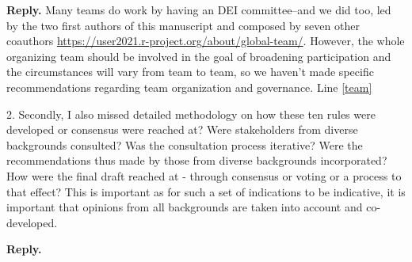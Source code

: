 \documentclass{article}
\newenvironment{Reply}{\noindent\color{BlueViolet}\textbf{Reply.}}{\vspace{1em}}
\begin{document}
\begin{Reply}
Many teams do work by having an DEI committee--and we did too, led by the two first authors of this manuscript and composed by seven other coauthors \url{https://user2021.r-project.org/about/global-team/}. However, the whole organizing team should be involved in the goal of broadening participation and the circumstances will vary from team to team, so we haven't made specific recommendations regarding team organization and governance.
Line \ref{team}



\end{Reply}

2. Secondly, I also missed detailed methodology on how these ten rules were developed or consensus were reached at? Were stakeholders from diverse backgrounds consulted? Was the consultation process iterative? Were the recommendations thus made by those from diverse backgrounds incorporated? How were the final draft reached at - through consensus or voting or a process to that effect? This is important as for such a set of indications to be indicative, it is important that opinions from all backgrounds are taken into account and co-developed.

\begin{Reply}
   
   
\end{Reply}
\end{document}

